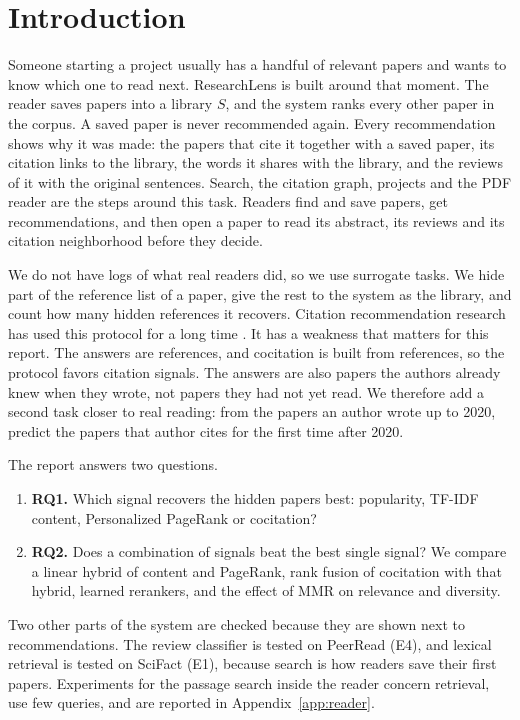 \documentclass[11pt,a4paper]{article}
\begin{document}
\clearpage
\tableofcontents
\clearpage
\listoffigures
\listoftables
\clearpage

\section{Introduction}\label{sec:intro}
Someone starting a project usually has a handful of relevant papers and wants to know which one to read next. ResearchLens is built around that moment. The reader saves papers into a library $S$, and the system ranks every other paper in the corpus. A saved paper is never recommended again. Every recommendation shows why it was made: the papers that cite it together with a saved paper, its citation links to the library, the words it shares with the library, and the reviews of it with the original sentences. Search, the citation graph, projects and the PDF reader are the steps around this task. Readers find and save papers, get recommendations, and then open a paper to read its abstract, its reviews and its citation neighborhood before they decide.

We do not have logs of what real readers did, so we use surrogate tasks. We hide part of the reference list of a paper, give the rest to the system as the library, and count how many hidden references it recovers. Citation recommendation research has used this protocol for a long time \citep{mcnee2002,strohman2007}. It has a weakness that matters for this report. The answers are references, and cocitation is built from references, so the protocol favors citation signals. The answers are also papers the authors already knew when they wrote, not papers they had not yet read. We therefore add a second task closer to real reading: from the papers an author wrote up to 2020, predict the papers that author cites for the first time after 2020.

The report answers two questions.
\begin{enumerate}
\item \textbf{RQ1.} Which signal recovers the hidden papers best: popularity, TF-IDF content, Personalized PageRank or cocitation?
\item \textbf{RQ2.} Does a combination of signals beat the best single signal? We compare a linear hybrid of content and PageRank, rank fusion of cocitation with that hybrid, learned rerankers, and the effect of MMR on relevance and diversity.
\end{enumerate}
Two other parts of the system are checked because they are shown next to recommendations. The review classifier is tested on PeerRead (E4), and lexical retrieval is tested on SciFact (E1), because search is how readers save their first papers. Experiments for the passage search inside the reader concern retrieval, use few queries, and are reported in Appendix~\ref{app:reader}.
\end{document}
